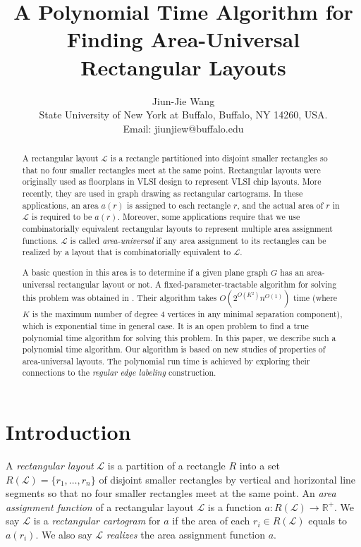 \documentclass[11pt]{article}
\title{A Polynomial Time Algorithm for Finding Area-Universal
\\ Rectangular Layouts}
\date{}
\author{
Jiun-Jie Wang\\
State University of New York  at Buffalo, Buffalo, NY 14260, USA.\\
Email: jiunjiew@buffalo.edu
}
\newcommand{\LL}{\mathcal{L}}
\begin{document}
\maketitle

\begin{abstract}
A rectangular layout $\LL$ is a rectangle partitioned into
disjoint smaller rectangles so that no four smaller rectangles meet at
the same point. Rectangular layouts were originally used as floorplans in VLSI design
to represent VLSI chip layouts. More recently, they are used in graph
drawing as rectangular cartograms. In these applications, an area
$a(r)$ is assigned to each rectangle $r$, and the actual area of
$r$ in $\LL$ is required to be $a(r)$. Moreover, some applications
require that we use combinatorially equivalent rectangular layouts
to represent multiple area assignment functions. $\LL$ is called
{\em area-universal} if any area assignment to its rectangles can be
realized by a layout that is combinatorially equivalent to $\LL$.

A basic question in this area is to determine if a given plane graph $G$
has an area-universal rectangular layout or not. A fixed-parameter-tractable
algorithm for solving this problem was obtained in \cite{EMSV12}.
Their algorithm takes $O(2^{O(K^2)}n^{O(1)})$ time (where $K$ is the
maximum number of degree 4 vertices in any minimal separation component),
which is exponential time in general case. It is an open problem to find a
true polynomial time algorithm for solving this problem.
In this paper, we describe such a polynomial time algorithm.
Our algorithm is based on new studies of properties of area-universal
layouts. The polynomial run time is achieved by exploring
their connections to the {\em regular edge labeling} construction.

\end{abstract}




\section{Introduction}\label{sec:Intro-universal}
A {\em rectangular layout} $\LL$ is a partition of a rectangle $R$
into a set $R(\LL)=\{ r_1, \ldots , r_n\}$ of disjoint smaller
rectangles by vertical and horizontal line segments so that no
four smaller rectangles meet at the same point.
An {\em area assignment function} of a rectangular layout $\LL$
is a function $a: R(\LL) \rightarrow \mathbb{R}^+$. We say $\LL$
is a {\em rectangular cartogram} for $a$ if the area of each
$r_i\in R(\LL)$ equals to $a(r_i)$. We also say $\LL$
{\em realizes} the area assignment function $a$.
\end{document}
